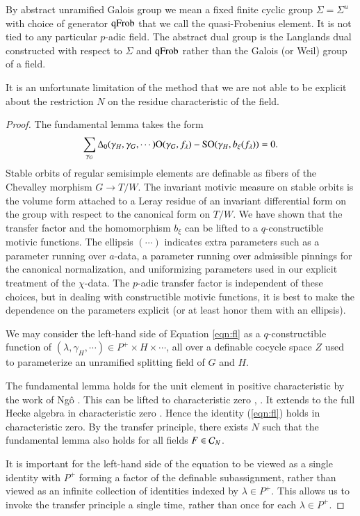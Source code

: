 By abstract unramified Galois group we mean a fixed finite cyclic group $\Sigma=\Sigma^u$ with choice of generator ${\operatorname{qFrob}}$
that we call the quasi-Frobenius element.  It is not tied to any particular $p$-adic field.   The abstract dual group is the Langlands
dual constructed with respect to $\Sigma$ and ${\operatorname{qFrob}}$ rather than the Galois (or Weil) group of a field.

It is an unfortunate limitation of the method that we are not able to be explicit about the restriction $N$ on the residue characteristic of the field.

\begin{proof}
The fundamental lemma takes the form
\begin{equation}\label{eqn:fl}
\sum_{\gamma_G}\Delta_0(\gamma_H,\gamma_G,\cdots){\operatorname{O}}(\gamma_G,f_\lambda) - {\operatorname{SO}}(\gamma_H,b_\xi(f_\lambda)) = 0.
\end{equation}
Stable orbits of regular semisimple elements are definable as fibers of the Chevalley morphism $G\to T/W$.  The invariant motivic measure
on stable orbits is the volume form attached to a Leray residue of an invariant differential form on the group with respect to the canonical
form on $T/W$.  We have shown that the transfer factor and the homomorphism $b_\xi$ can be lifted to a $q$-constructible motivic functions.
The ellipsis $(\cdots)$ indicates extra parameters such as a parameter running over $a$-data, a parameter running over admissible pinnings
for the canonical normalization, and uniformizing parameters used in our explicit treatment of the $\chi$-data.  The $p$-adic transfer factor is independent of these choices,
but in dealing with constructible motivic functions, it is best to make the dependence on the parameters explicit (or at least honor them with an ellipsis).

We may consider the left-hand side of Equation \ref{eqn:fl} as a $q$-constructible function of $(\lambda,\gamma_H,\cdots)\in P^+\times H\times\cdots$, all over a definable
cocycle space $Z$ used to parameterize an unramified splitting field of $G$ and $H$.  

The fundamental lemma holds for the unit element in positive characteristic by the work of Ng\^o \cite{ngo2010lemme}.
This can be lifted to characteristic zero \cite{cluckers2011transfer}, \cite{waldspurger2006endoscopie}.  
It extends to the full Hecke algebra in characteristic zero \cite{hales1995fundamental}.
Hence the identity (\ref{eqn:fl}) holds in characteristic zero.
By the transfer principle, 
there exists $N$ such that the fundamental lemma also holds for all fields $F\in\mathcal C_N$.

It is important for the left-hand side of the equation to be viewed as a 
single identity with $P^+$ forming a factor of the definable subassignment, rather than viewed as an infinite collection of identities indexed by $\lambda\in P^+$.
This allows us to invoke the transfer principle a single time, rather than once for each $\lambda\in P^+$.
\end{proof}

